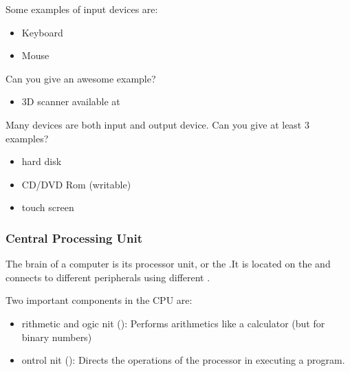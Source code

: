 \documentclass[letterpaper,10pt,english]{sphinxmanual}
\begin{document}
 Some examples of input devices are:
\begin{itemize}
\item {} 
Keyboard

\item {} 
Mouse

\end{itemize}

Can you give an awesome example?
\begin{itemize}
\item {} 
3D scanner available at 

\end{itemize}

 Many devices are both input and output device. Can you give at least 3 examples?
\begin{itemize}
\item {} 
hard disk

\item {} 
CD/DVD Rom (writable)

\item {} 
touch screen

\end{itemize}


\subsubsection{Central Processing Unit}
\label{\detokenize{Lecture1/Introduction to Computer Programming:central-processing-unit}}


The brain of a computer is its processor unit, or the .It is located on the  and connects to different peripherals using different .

Two important components in the CPU are:
\begin{itemize}
\item {} 
rithmetic and ogic nit (): Performs arithmetics like a calculator (but for binary numbers)

\item {} 
ontrol nit (): Directs the operations of the processor in executing a program.

\end{itemize}
\end{document}
